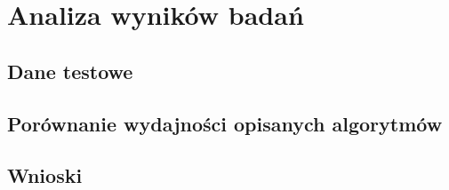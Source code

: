 \chapter{Analiza wyników badań}
\label{results}
\section{Dane testowe}
\section{Porównanie wydajności opisanych algorytmów}
\section{Wnioski}
\par{

  
}